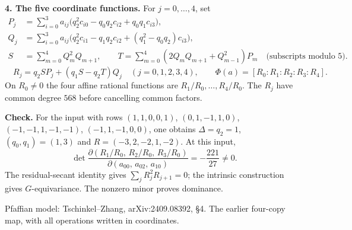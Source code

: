 \documentclass[11pt]{article}
\begin{document}
\textbf{4. The five coordinate functions.}
For $j=0,\ldots,4$, set
\[
\begin{aligned}
P_j&=\sum_{i=0}^3 a_{ij}\bigl(q_2^2c_{i0}-q_0q_2c_{i2}+q_0q_1c_{i3}\bigr),\\
Q_j&=\sum_{i=0}^3 a_{ij}\bigl(q_2^2c_{i1}-q_1q_2c_{i2}+(q_1^2-q_0q_2)c_{i3}\bigr),\\
S&=\sum_{m=0}^4 Q_m^2Q_{m+1},\qquad
T=\sum_{m=0}^4(2Q_mQ_{m+1}+Q_{m-1}^2)P_m\quad\text{(subscripts modulo 5).}
\end{aligned}
\]
\[
\boxed{\quad R_j=q_2SP_j+(q_1S-q_2T)Q_j\quad(j=0,1,2,3,4),\qquad
\Phi(a)=[R_0:R_1:R_2:R_3:R_4].\quad}
\]
On $R_0\ne0$ the four affine rational functions are $R_1/R_0,\ldots,R_4/R_0$.
The $R_j$ have common degree $568$ before cancelling common factors.

\textbf{Check.}
For the input with rows $(1,1,0,0,1)$, $(0,1,-1,1,0)$, $(-1,-1,1,-1,-1)$,
$(-1,1,-1,0,0)$, one obtains $\Delta=q_2=1$, $(q_0,q_1)=(1,3)$ and
$R=(-3,2,-2,1,-2)$. At this input,
\[
\det\frac{\partial(R_1/R_0,\,R_2/R_0,\,R_3/R_0)}{\partial(a_{00},\,a_{02},\,a_{10})}
=-\frac{221}{27}\ne0.
\]
The residual-secant identity gives $\sum_jR_j^2R_{j+1}=0$; the intrinsic construction gives
$G$-equivariance. The nonzero minor proves dominance.

\vfill
{\footnotesize Pfaffian model: Tschinkel--Zhang, arXiv:2409.08392, \S4.
The earlier four-copy map, with all operations written in coordinates.\par}
\end{document}
